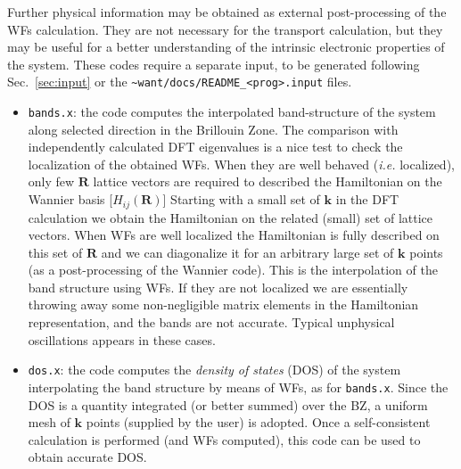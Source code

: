 \noindent
Further physical information may be obtained as external
post-processing of the WFs calculation. They are not necessary for
the transport calculation, but they may be useful for a
better understanding of the intrinsic electronic properties of the
system. These codes require a separate input, to be generated
following Sec.~\ref{sec:input} or the
{\tt \~{}want/docs/README\_<prog>.input} files.

%
%
\begin{itemize}
%
\item {\tt bands.x}: the code computes the interpolated band-structure
      of the system along selected direction in the Brillouin Zone.
      The comparison with independently calculated DFT eigenvalues is
      a nice test to check the localization of the obtained WFs.
      When they are well behaved ({\it i.e.} localized), only few $\mathbf{R}$ lattice
      vectors are required to described the Hamiltonian on the Wannier basis
      [$H_{ij}(\mathbf{R})$]
      Starting with a small set of $\mathbf{k}$ in the DFT calculation
      we obtain the Hamiltonian on the related (small) set of lattice vectors.
      When WFs are well localized
      the Hamiltonian is fully described on this set of $\mathbf{R}$ and we can
      diagonalize it for an arbitrary large set of $\mathbf{k}$ points
      (as a post-processing of the Wannier code). This is the
      interpolation of the band structure using WFs. If they are not localized
      we are essentially throwing away some non-negligible matrix elements
      in the Hamiltonian representation, and the bands
      are not accurate. Typical unphysical oscillations appears in these cases.

\item {\tt dos.x}: the code computes the {\it density of states} (DOS) 
      of the system interpolating the band structure by means of WFs, as
      for {\tt bands.x}. Since the DOS is a quantity integrated (or better summed)
      over the BZ, a uniform mesh of $\mathbf{k}$ points (supplied by the user)
      is adopted.
      Once a self-consistent calculation is performed (and WFs computed), this code can be 
      used to obtain accurate DOS. 


\end{itemize}
